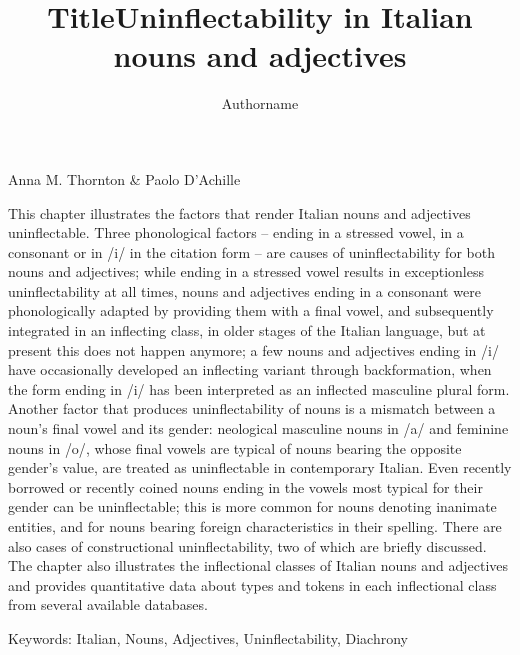 \documentclass[output=paper]{langscibook}
\author{Authorname\orcid{}\affiliation{}}
\title{Title}
\begin{document}
\maketitle 

\title{Uninflectability in Italian nouns and adjectives}

Anna M. Thornton \& Paolo D’Achille

\begin{stylelsAbstract}
This chapter illustrates the factors that render Italian nouns and adjectives uninflectable. Three phonological factors – ending in a stressed vowel, in a consonant or in \textup{/i/} in the citation form – are causes of uninflectability for both nouns and adjectives; while ending in a stressed vowel results in exceptionless uninflectability at all times, nouns and adjectives ending in a consonant were phonologically adapted by providing them with a final vowel, and subsequently integrated in an inflecting class, in older stages of the Italian language, but at present this does not happen anymore; a few nouns and adjectives ending in \textup{/i/} have occasionally developed an inflecting variant through backformation, when the form ending in \textup{/i/} has been interpreted as an inflected masculine plural form. Another factor that produces uninflectability of nouns is a mismatch between a noun’s final vowel and its gender: neological masculine nouns in \textup{/a/} and feminine nouns in \textup{/o/}, whose final vowels are typical of nouns bearing the opposite gender’s value, are treated as uninflectable in contemporary Italian.  Even recently borrowed or recently coined nouns ending in the vowels most typical for their gender can be uninflectable; this is more common for nouns denoting inanimate entities, and for nouns bearing foreign characteristics in their spelling. There are also cases of constructional uninflectability, two of which are briefly discussed. The chapter also illustrates the inflectional classes of Italian nouns and adjectives and provides quantitative data about types and tokens in each inflectional class from several available databases. 
\end{stylelsAbstract}

\begin{stylelsAbstract}
\textup{Keywords}: Italian, Nouns, Adjectives, Uninflectability, Diachrony
\end{stylelsAbstract}
\end{document}
